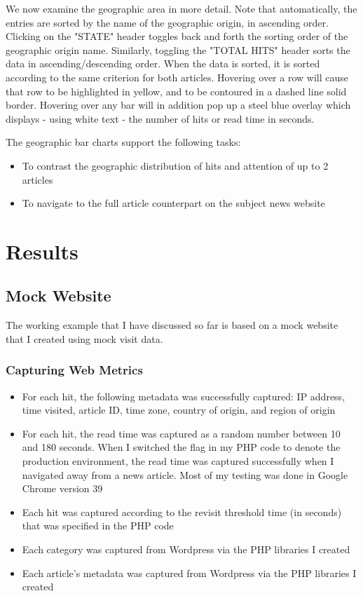 \documentclass[12pt]{article}
\begin{document}
\noindent We now examine the geographic area in more detail. Note that automatically, the entries are sorted by the name of the geographic origin, in ascending order. Clicking on the "STATE" header toggles back and forth the sorting order of the geographic origin name. Similarly, toggling the "TOTAL HITS" header sorts the data in ascending/descending order. When the data is sorted, it is sorted according to the same criterion for both articles. Hovering over a row will cause that row to be highlighted in yellow, and to be contoured in a dashed line solid border. Hovering over any bar will in addition pop up a steel blue overlay which displays - using white text - the number of hits or read time in seconds.  

The geographic bar charts support the following tasks:
\begin{itemize}
\item To contrast the geographic distribution of hits and attention of up to 2 articles
\item To navigate to the full article counterpart on the subject news website
\end{itemize}

\newpage

\section{Results}

\subsection{Mock Website}
The working example that I have discussed so far is based on a mock website that I created using mock visit data.

\subsubsection{Capturing Web Metrics}
\begin{itemize}
\item For each hit, the following metadata was successfully captured: IP address, time visited, article ID, time zone, country of origin, and region of origin
\item For each hit, the read time was captured as a random number between 10 and 180 seconds. When I switched the flag in my PHP code to denote the production environment, the read time was captured successfully when I navigated away from a news article. Most of my testing was done in Google Chrome version 39
\item Each hit was captured according to the revisit threshold time (in seconds) that was specified in the PHP code
\item Each category was captured from Wordpress via the PHP libraries I created
\item Each article's metadata was captured from Wordpress via the PHP libraries I created
\end{itemize}
\end{document}
